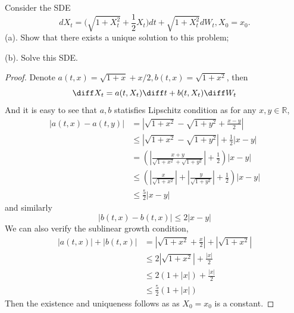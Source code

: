     \problem
    \begin{question}
        Consider the SDE
        \[dX_t=\Big(\sqrt{1+X^2_t}+\frac{1}{2}X_t\Big)dt+\sqrt{1+X^2_t}dW_t, X_0=x_0.\]
        (a).  Show that there exists a unique solution to this problem;

        (b).  Solve this SDE.
    \end{question}
    \begin{subproblem}
        \item
        \begin{proof}
            Denote $a(t,x)=\sqrt{1+x}+x/2,b(t,x)=\sqrt{1+x^2}$, then
            \[\diff X_t=a(t,X_t)\diff t+b(t,X_t)\diff W_t\]
            And it is easy to see that $a,b$ statisfies Lipschitz condition as
            for any $x,y\in\mathbb R$,
            \[\begin{aligned}
                |a(t,x)-a(t,y)|
                &=\left|\sqrt{1+x^2}-\sqrt{1+y^2}+\frac{x-y}{2}\right|\\
                &\leq\left|\sqrt{1+x^2}-\sqrt{1+y^2}\right|+\frac{1}{2}|x-y|\\
                &=\left(\left|\frac{x+y}{\sqrt{1+x^2}+\sqrt{1+y^2}}\right|+\frac{1}{2}\right)|x-y|\\
                &\leq\left(\left|\frac{x}{\sqrt{1+x^2}}\right|
                +\left|\frac{y}{\sqrt{1+y^2}}\right|+\frac{1}{2}\right)|x-y|\\
                &\leq\frac{5}{2}|x-y|
            \end{aligned}\]
            and similarly
            \[|b(t,x)-b(t,x)|\leq 2|x-y|\]
            We can also verify the sublinear growth condition,
            \[\begin{aligned}
                |a(t,x)|+|b(t,x)|&=\left|\sqrt{1+x^2}+\frac{x}{2}\right|
                +\left|\sqrt{1+x^2}\right|\\
                &\leq 2\left|\sqrt{1+x^2}\right|+\frac{|x|}{2}\\
                &\leq 2(1+|x|)+\frac{|x|}{2}\\
                &\leq \frac{5}{2}(1+|x|)
            \end{aligned}\]
            Then the existence and uniqueness follows as
            as $X_0=x_0$ is a constant.
        \end{proof}


\end{subproblem}

